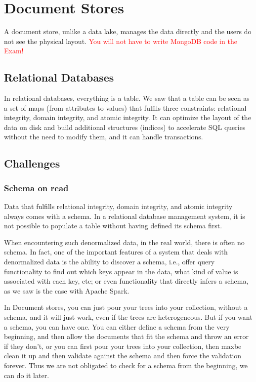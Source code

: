 \section{Document Stores}

A document store, unlike a data lake, manages the data directly and the users do not see the physical layout.
\textcolor{red}{You will not have to write MongoDB code in the Exam!}

\subsection{Relational Databases}
In relational databases, everything is a table. We saw that a table can be seen as a set of maps (from attributes to values) that fulfils three constraints: relational integrity, domain integrity, and atomic integrity. It can optimize the layout of the data on disk and build additional structures (indices) to accelerate SQL queries without the need
to modify them, and it can handle transactions.

\subsection{Challenges}

\subsubsection{Schema on read}
Data that fulfills relational integrity, domain integrity, and atomic integrity always comes with a schema. In a relational database management system, it is not possible to populate a table without having defined its schema first.

When encountering such denormalized data, in the real world, there is often no schema. In fact, one of the important features of a system that deals with denormalized data is the ability to discover a schema, i.e., offer query functionality to find out which keys appear in the data, what kind of value is associated with each key, etc; or even functionality that directly infers a schema, as we saw is the case with Apache Spark.

In Document stores, you can just pour your trees into your collection, without a schema, and it will just work, even if the trees are heterogeneous. But if you want a schema, you can have one. You can either define a schema from the very beginning, and then allow the documents that fit the schema and throw an error if they don't, or you can first pour your trees into your collection, then maxbe clean it up and then validate against the schema and then force the validation forever. Thus we are not obligated to check for a schema from the beginning, we can do it later.

